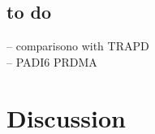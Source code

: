 \documentclass[fleqn,10pt]{wlscirep}
\begin{document}





\noindent
\subsection*{to do}
-- comparisono with TRAPD\\ 
-- PADI6 PRDMA\\


\section*{Discussion}





\end{document}
